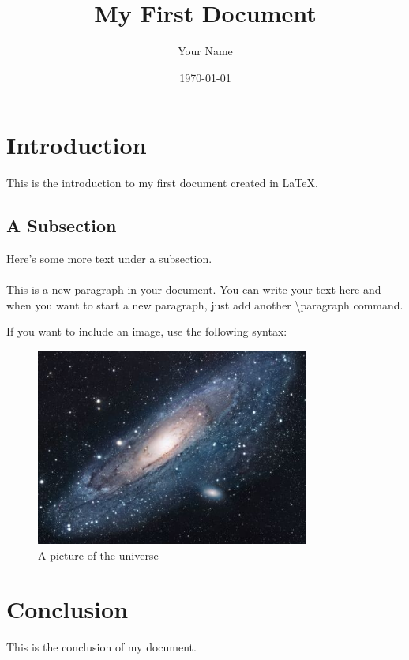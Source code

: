 \documentclass{article}
\title{My First Document}
\author{Your Name}
\date{\today} %
\begin{document}
\maketitle %

\section{Introduction}
This is the introduction to my first document created in \LaTeX.

\subsection{A Subsection}
Here's some more text under a subsection.

\paragraph{}
This is a new paragraph in your document. You can write your text here and when you want to start a new paragraph, just add another \textbackslash{}paragraph command.

If you want to include an image, use the following syntax:
\begin{figure}[ht]
\centering
\includegraphics[width=0.8\textwidth]{universe.jpg}
\caption{A picture of the universe}
\label{fig:universe}
\end{figure}

\section{Conclusion}
This is the conclusion of my document.
\end{document}
